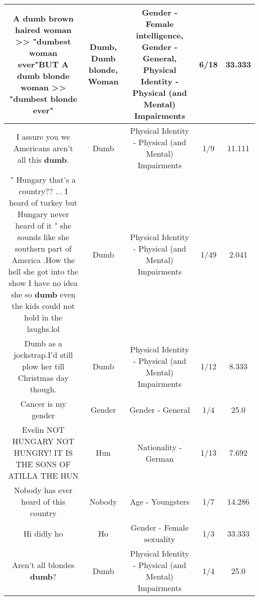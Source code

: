\documentclass[11pt]{article}
\newlength\mylength
\begin{document}
\begin{center}
\begin{longtable}{|C{.65\mylength}|C{.30\mylength}|C{.12\mylength}|C{.12\mylength}|C{.12\mylength}|}
  \small A \textbf{dumb} brown haired \textbf{woman} >> "dumbest \textbf{woman} ever"BUT A \textbf{d\textbf{umb} blonde} \textbf{woman} >> "dumbest blonde ever"\normalsize   & Dumb, Dumb blonde, Woman & Gender - Female intelligence, Gender - General, Physical Identity - Physical (and Mental) Impairments & 6/18 & 33.333 \\  \hline
  \small I assure you we Americans aren't all this \textbf{dumb}.\normalsize   & Dumb & Physical Identity - Physical (and Mental) Impairments & 1/9 & 11.111 \\  \hline
  \small " Hungary that's a country?? ... I heard of turkey but Hungary never heard of it " she sounds like she southern part of America .How the hell she got into the show I have no idea she so \textbf{dumb} even the kids could not hold in the laughs.lol\normalsize   & Dumb & Physical Identity - Physical (and Mental) Impairments & 1/49 & 2.041 \\  \hline
  \small Dumb as a jockstrap.I'd still plow her till Christmas day though.\normalsize   & Dumb & Physical Identity - Physical (and Mental) Impairments & 1/12 & 8.333 \\  \hline
  \small Cancer is my gender\normalsize   & Gender & Gender - General & 1/4 & 25.0 \\  \hline
  \small Evelin NOT HUNGARY NOT HUNGRY! IT IS THE SONS OF ATILLA THE HUN\normalsize   & Hun & Nationality - German & 1/13 & 7.692 \\  \hline
  \small Nobody has ever heard of this country\normalsize   & Nobody & Age - Youngsters & 1/7 & 14.286 \\  \hline
  \small Hi didly ho\normalsize   & Ho & Gender - Female sexuality & 1/3 & 33.333 \\  \hline
  \small Aren't all blondes \textbf{dumb}?\normalsize   & Dumb & Physical Identity - Physical (and Mental) Impairments & 1/4 & 25.0 \\  \hline

\end{longtable}
\end{center}
\end{document}
